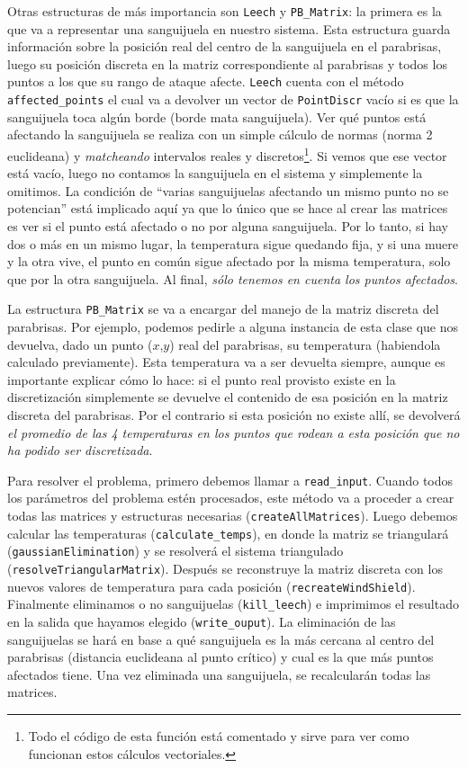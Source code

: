 Otras estructuras de más importancia son \texttt{Leech} y \texttt{PB\_Matrix}: la primera es la que va a representar una sanguijuela en nuestro sistema. Esta estructura guarda información sobre la posición real del centro de la sanguijuela en el parabrisas, luego su posición discreta en la matriz correspondiente al parabrisas y todos los puntos a los que su rango de ataque afecte. \texttt{Leech} cuenta con el método \texttt{affected\_points} el cual va a devolver un vector de \texttt{PointDiscr} vacío si es que la sanguijuela toca algún borde (borde mata sanguijuela). Ver qué puntos está afectando la sanguijuela se realiza con un simple cálculo de normas (norma 2 euclideana) y \textit{matcheando} intervalos reales y discretos\footnote{Todo el código de esta función está comentado y sirve para ver como funcionan estos cálculos vectoriales.}. Si vemos que ese vector está vacío, luego no contamos la sanguijuela en el sistema y simplemente la omitimos. La condición de ``varias sanguijuelas afectando un mismo punto no se potencian'' está implicado aquí ya que lo único que se hace al crear las matrices es ver si el punto está afectado o no por alguna sanguijuela. Por lo tanto, si hay dos o más en un mismo lugar, la temperatura sigue quedando fija, y si una muere y la otra vive, el punto en común sigue afectado por la misma temperatura, solo que por la otra sanguijuela. Al final, \textit{sólo tenemos en cuenta los puntos afectados}.

La estructura \texttt{PB\_Matrix} se va a encargar del manejo de la matriz discreta del parabrisas. Por ejemplo, podemos pedirle a alguna instancia de esta clase que nos devuelva, dado un punto ($x$,$y$) real del parabrisas, su temperatura (habiendola calculado previamente). Esta temperatura va a ser devuelta siempre, aunque es importante explicar cómo lo hace: si el punto real provisto existe en la discretización simplemente se devuelve el contenido de esa posición en la matriz discreta del parabrisas. Por el contrario si esta posición no existe allí, se devolverá \textit{el promedio de las 4 temperaturas en los puntos que rodean a esta posición que no ha podido ser discretizada}.

\vspace{\baselineskip}

Para resolver el problema, primero debemos llamar a \texttt{read\_input}. Cuando todos los parámetros del problema estén procesados, este método va a proceder a crear todas las matrices y estructuras necesarias (\texttt{createAllMatrices}). Luego debemos calcular las temperaturas (\texttt{calculate\_temps}), en donde la matriz se triangulará (\texttt{gaussianElimination}) y se resolverá el sistema triangulado (\texttt{resolveTriangularMatrix}). Después se reconstruye la matriz discreta con los nuevos valores de temperatura para cada posición (\texttt{recreateWindShield}). Finalmente eliminamos o no sanguijuelas (\texttt{kill\_leech}) e imprimimos el resultado en la salida que hayamos elegido (\texttt{write\_ouput}). La eliminación de las sanguijuelas se hará en base a qué sanguijuela es la más cercana al centro del parabrisas (distancia euclideana al punto crítico) y cual es la que más puntos afectados tiene. Una vez eliminada una sanguijuela, se recalcularán todas las matrices.

